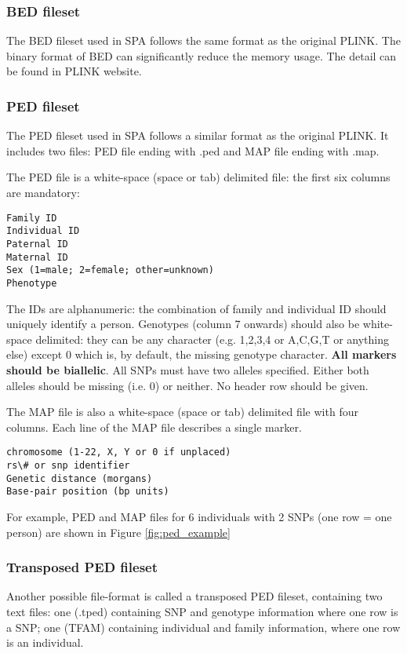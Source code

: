 \documentclass[12pt]{article}
\begin{document}
\subsubsection*{BED fileset}
The BED fileset used in SPA follows the same format as the original PLINK. The binary format of BED
can significantly reduce the memory usage. The detail can be found in PLINK website.

\subsubsection*{PED fileset}
The PED fileset used in SPA follows a similar format as the original PLINK. It includes two files: PED
file ending with .ped and MAP file ending with .map. 

The PED file is a white-space (space or tab) delimited file: the first six columns are mandatory:
\begin{verbatim}
Family ID
Individual ID
Paternal ID
Maternal ID
Sex (1=male; 2=female; other=unknown)
Phenotype
\end{verbatim}
The IDs are alphanumeric: the combination of family and individual ID should uniquely identify a
person. Genotypes (column 7 onwards) should also be white-space delimited: they can be any character
(e.g. 1,2,3,4 or A,C,G,T or anything else) except $0$ which is, by default, the missing genotype
character. \textbf{All markers should be biallelic}. All SNPs must have two alleles specified.
Either both alleles should be missing (i.e. 0) or neither. No header row should be given. 

The MAP file is also a white-space (space or tab) delimited file with four columns. Each  line of
the MAP file describes a single marker.
\begin{verbatim}
chromosome (1-22, X, Y or 0 if unplaced)
rs\# or snp identifier
Genetic distance (morgans)
Base-pair position (bp units)
\end{verbatim}

For example, PED and MAP files for 6 individuals with 2 SNPs (one row = one person) are shown in
Figure \ref{fig:ped_example}


\subsubsection*{Transposed PED fileset}
Another possible file-format is called a transposed PED fileset, containing two text files: one
(.tped) containing SNP and genotype information where one row is a SNP; one (TFAM) containing
individual and family information, where one row is an individual.
\end{document}
